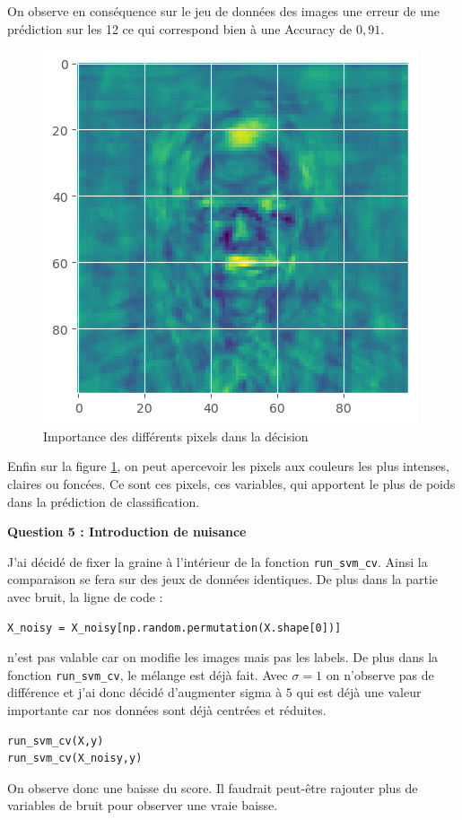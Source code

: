 \documentclass[10pt,a4paper]{article}
\begin{document}
On observe en conséquence sur le jeu de données des images une erreur de une  prédiction sur les 12 ce qui correspond bien à une Accuracy de $0,91$.

\begin{figure}[H]
\centerline{\includegraphics[width=0.5\linewidth]{images/coef_blair.png}}
\caption{Importance des différents pixels dans la décision}
\label{fig:pix_dec}
\end{figure}

Enfin sur la figure \ref{fig:pix_dec}, on peut apercevoir les pixels aux couleurs les plus intenses, claires ou foncées. Ce sont ces pixels, ces variables, qui apportent le plus de poids dans la prédiction de classification. 

\bigskip

\textbf{Question 5 : Introduction de nuisance}

J'ai décidé de fixer la graine à l'intérieur de la fonction \texttt{run\_svm\_cv}. Ainsi la comparaison se fera sur des jeux de données identiques. De plus dans la partie avec bruit, la ligne de code : 

\begin{lstlisting}
X_noisy = X_noisy[np.random.permutation(X.shape[0])]
\end{lstlisting}

n'est pas valable car on modifie les images mais pas les labels. De plus dans la fonction \texttt{run\_svm\_cv}, le mélange est déjà fait. Avec $\sigma=1$ on n'observe pas de différence et j'ai donc décidé d'augmenter sigma à $5$ qui est déjà une valeur importante car nos données sont déjà centrées et réduites.

\begin{lstlisting}
run_svm_cv(X,y)
run_svm_cv(X_noisy,y)
\end{lstlisting}

On observe donc une baisse du score. Il faudrait peut-être rajouter plus de variables de bruit pour observer une vraie baisse.
\end{document}
